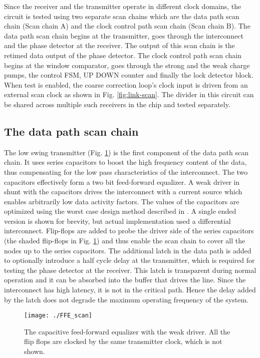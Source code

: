 \documentclass[conference]{IEEEtran}
\begin{document}
Since the receiver and 
the transmitter operate in different clock domains, the circuit 
is tested using two separate scan chains
which are the data path scan chain (Scan chain A) and the clock control path
scan chain (Scan chain B). 
The data path scan chain begins at the transmitter, goes through the interconnect
and the phase detector at the receiver. The output of this scan chain is the
 retimed data output of the phase detector.
The clock control path scan chain begins at the window comparator, goes through
the strong and the weak charge pumps, the control FSM, UP DOWN counter and
finally the lock detector block.
When test is enabled, the coarse correction loop's clock input
is driven from an external scan clock as shown in Fig. \ref{fig:link-scan}.
The divider in this circuit can be shared across multiple such receivers in the
chip and tested separately.





\subsection{The data path scan chain}
The low swing transmitter (Fig. \ref{fig:FFE_model}) is the first component
of the data path scan chain. It uses series 
capacitors to boost the high frequency content of the data, thus
compensating for the low pass characteristics of the interconnect. The 
two capacitors effectively form a two bit feed-forward equalizer. A weak driver
in shunt with the capacitors drives the interconnect with a current source which
enables arbitrarily low data activity factors. The values of the capacitors are 
optimized using the worst case design method described in \cite{naveen_vlsi13}. 
A single ended version is shown for brevity, but actual 
implementation used a differential interconnect. Flip-flops
are added to probe the driver side of the series capacitors (the shaded
flip-flops in Fig. \ref{fig:FFE_model})
and thus enable the scan chain to cover all the nodes up to the 
series capacitors. The additional latch in the data path is added
to optionally introduce a half cycle delay at the transmitter, which 
is required for testing the phase detector at the receiver. This latch 
is transparent during normal operation and it can be absorbed into the 
buffer that drives the line. Since the interconnect has high  
latency, it is not in the critical path. Hence the delay added by the latch
does not degrade the maximum operating frequency of the system.

\begin{figure}[h!]
\centering
{}
\texttt{[image: ./FFE\_scan]}
\caption{The capacitive feed-forward equalizer with the weak driver. 
All the flip flops are clocked by the same transmitter clock, which
is not shown.}
\label{fig:FFE_model}
\end{figure}
\end{document}
